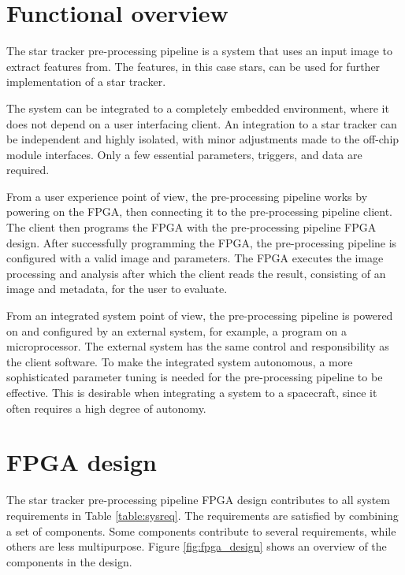 \documentclass[12pt]{report}
\begin{document}
\section{Functional overview}
The star tracker pre-processing pipeline is a system that uses an input image to extract features from. The features, in this case stars, can be used for further implementation of a star tracker. %
\par
The system can be integrated to a completely embedded environment, where it does not depend on a user interfacing client. 
An integration to a star tracker can be independent and highly isolated, with minor adjustments made to the off-chip module interfaces. Only a few essential parameters, triggers, and data are required.  
\par
From a user experience point of view, the pre-processing pipeline works by powering on the FPGA, then connecting it to the pre-processing pipeline client. The client then programs the FPGA with the pre-processing pipeline FPGA design. After successfully programming the FPGA, the pre-processing pipeline is configured with a valid image and parameters. The FPGA executes the image processing and analysis after which the client reads the result, consisting of an image and metadata, for the user to evaluate.
\par
From an integrated system point of view, the pre-processing pipeline is powered on and configured by an external system, for example, a program on a microprocessor. The external system has the same control and responsibility as the client software. To make the integrated system autonomous, a more sophisticated parameter tuning is needed for the pre-processing pipeline to be effective. This is desirable when integrating a system to a spacecraft, since it often requires a high degree of autonomy.

\section{FPGA design}

The star tracker pre-processing pipeline FPGA design contributes to all system requirements in Table \ref*{table:sysreq}. The requirements are satisfied by combining a set of components. Some components contribute to several requirements, while others are less multipurpose. Figure \ref*{fig:fpga_design} shows an overview of the components in the design.
\end{document}
